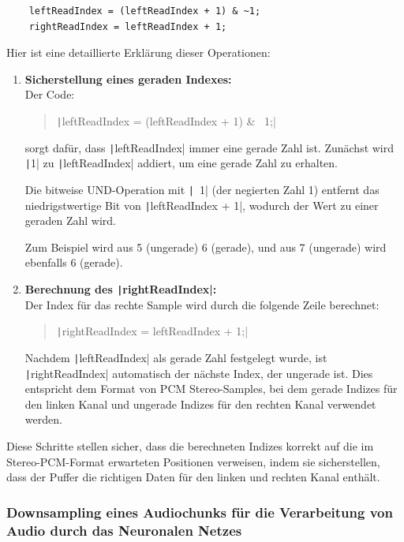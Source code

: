 \begin{verbatim}
	leftReadIndex = (leftReadIndex + 1) & ~1;
	rightReadIndex = leftReadIndex + 1;
\end{verbatim}


\noindent
Hier ist eine detaillierte Erklärung dieser Operationen:

\begin{enumerate}
	\item \textbf{Sicherstellung eines geraden Indexes:} \\
	Der Code:
	\begin{quote}
		\texttt|leftReadIndex = (leftReadIndex + 1) & ~1;|
	\end{quote}
	sorgt dafür, dass \texttt|leftReadIndex| immer eine gerade Zahl ist. Zunächst wird \texttt|1| zu \texttt|leftReadIndex| addiert, um eine gerade Zahl zu erhalten. 
	
	Die bitweise UND-Operation mit \texttt|~1| (der negierten Zahl 1) entfernt das niedrigstwertige Bit von \texttt|leftReadIndex + 1|, wodurch der Wert zu einer geraden Zahl wird. 
	
	Zum Beispiel wird aus 5 (ungerade) 6 (gerade), und aus 7 (ungerade) wird ebenfalls 6 (gerade).
	
	\item \textbf{Berechnung des \texttt|rightReadIndex|:} \\
	Der Index für das rechte Sample wird durch die folgende Zeile berechnet:
	\begin{quote}
		\texttt|rightReadIndex = leftReadIndex + 1;|
	\end{quote}
	Nachdem \texttt|leftReadIndex| als gerade Zahl festgelegt wurde, ist \texttt|rightReadIndex| automatisch der nächste Index, der ungerade ist. Dies entspricht dem Format von PCM Stereo-Samples, bei dem gerade Indizes für den linken Kanal und ungerade Indizes für den rechten Kanal verwendet werden.
\end{enumerate}

Diese Schritte stellen sicher, dass die berechneten Indizes korrekt auf die im Stereo-PCM-Format erwarteten Positionen verweisen, indem sie sicherstellen, dass der Puffer die richtigen Daten für den linken und rechten Kanal enthält.


\subsubsection{Downsampling eines Audiochunks für die Verarbeitung von Audio durch das Neuronalen Netzes}
\label{sec:audio-downsampling}


